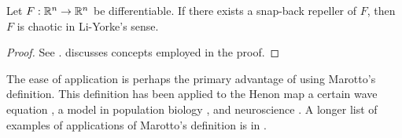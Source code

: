 \documentclass[12pt,draft,twoside]{book}
\begin{document}
\begin{theorem}
  \citep{marotto1,marotto2}
  Let $F: \mathbb{R}^n \to \mathbb{R}^n$ be differentiable.
  If there exists a snap-back repeller of $F$, then $F$ is chaotic in Li-Yorke's sense.
  \label{thm:sbrepeller}
  \begin{proof}
    See \citet[Theorem 3.1]{marotto1}.
    \citet{martellibook} discusses concepts employed in the proof.
  \end{proof}
\end{theorem}
The ease of application is perhaps the primary advantage of using Marotto's definition.
This definition has been applied to the Henon map \citep{marotto1} a certain wave equation \citep{marottoapp1}, a model in population biology \citep{marottoapp2}, and neuroscience \citep{marottoapp3}.
A longer list of examples of applications of Marotto's definition is in \citet{marotto2}.
\end{document}
